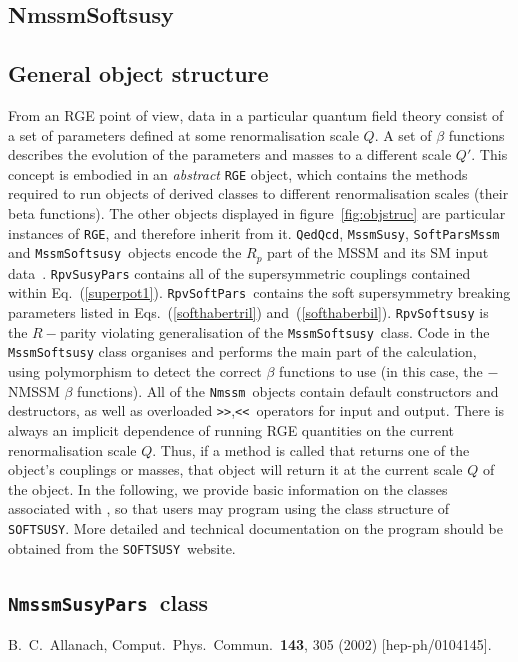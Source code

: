\documentclass[final,3p,times,pdflatex]{elsarticle}
\def\SOFTSUSY{{\tt SOFTSUSY}}
\def\code#1{\small{\tt #1}\normalsize}
\begin{document}
\subsection{NmssmSoftsusy}
\label{nmssmsoftsusy}


\subsection{General object structure}

From an RGE point of view, data in a particular quantum field theory 
consist of a set of parameters defined at some
renormalisation scale $Q$. 
A set of $\beta$ functions describes the
evolution of the parameters and masses to a different scale
$Q'$. This concept is embodied in an {\em abstract} \code{RGE}
object, which contains the methods required to run objects of derived
classes to different renormalisation scales (their beta functions). The other
objects 
displayed in figure~\ref{fig:objstruc} are particular instances of
\code{RGE}, and therefore inherit from it. \code{QedQcd}, \code{MssmSusy},
\code{SoftParsMssm} and \code{MssmSoftsusy}~objects encode the $R_p$ part of the
MSSM and its SM input data~\cite{Allanach:2001kg}.
\code{RpvSusyPars} contains all of the supersymmetric  couplings contained
within  Eq.~(\ref{superpot1}). 
\code{RpvSoftPars}~contains the  soft supersymmetry breaking parameters
listed in 
Eqs.~(\ref{softhabertril}) and~(\ref{softhaberbil}). \code{RpvSoftsusy} is
the  $R-$parity violating
generalisation of the \code{MssmSoftsusy}~class. 
Code in
the \code{MssmSoftsusy} class organises and performs the main part of
the calculation, using polymorphism to detect the correct $\beta$ functions to
use (in this case, the $-$NMSSM $\beta$ functions). 
All of the \code{Nmssm}~objects contain default constructors
and destructors, as well as overloaded \code{>>},\code{<<}~operators for input
and output. 
There is always an implicit dependence of running RGE quantities on the
current renormalisation scale $Q$. Thus, if a method is called that returns
one of the object's couplings or masses, that object will return it at the
current scale $Q$ of the object. 
In the following, we provide basic information on the 
classes associated with , so that users may program using the class
structure of \SOFTSUSY\@. More detailed and
technical documentation on the program should be obtained from the
\SOFTSUSY~website. 


\subsection{\code{NmssmSusyPars}~class}

\begin{thebibliography}{10}
  B.~C.~Allanach,
  Comput.\ Phys.\ Commun.\  {\bf 143}, 305 (2002)
  [hep-ph/0104145].

\end{thebibliography}
\end{document}
